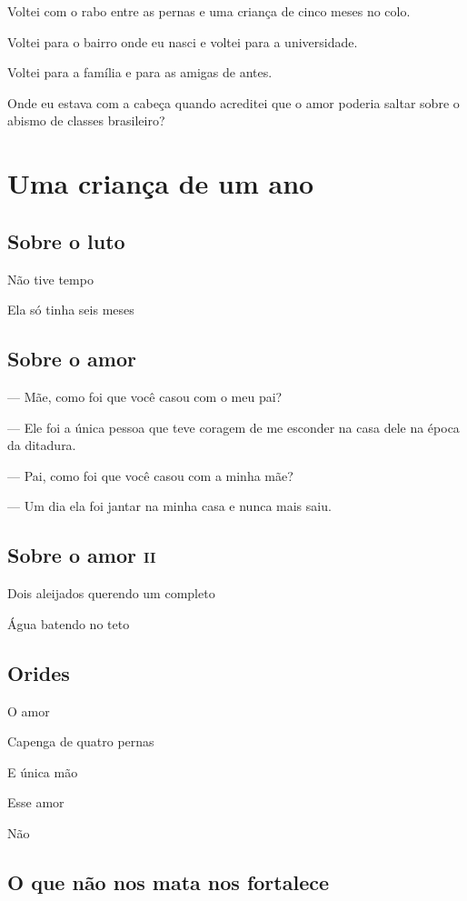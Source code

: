 Voltei com o rabo entre as pernas e uma criança de cinco meses no colo.

Voltei para o bairro onde eu nasci e voltei para a universidade.

Voltei para a família e para as amigas de antes.

Onde eu estava com a cabeça quando acreditei que o amor poderia saltar
sobre o abismo de classes brasileiro?


  \part{Uma criança de um ano}

\chapter{Sobre o luto}

Não tive tempo

Ela só tinha seis meses

\chapter{Sobre o amor}

— Mãe, como foi que você casou com o meu pai?

— Ele foi a única pessoa que teve coragem de me esconder na casa dele na
época da ditadura.

— Pai, como foi que você casou com a minha mãe?

— Um dia ela foi jantar na minha casa e nunca mais saiu.

\chapter{Sobre o amor \textsc{ii}}

Dois aleijados querendo um completo

Água batendo no teto

\chapter{Orides}

O amor

Capenga de quatro pernas

E única mão

Esse amor

Não

\chapter{O que não nos mata nos fortalece}

